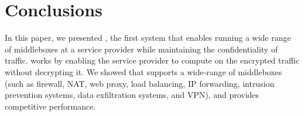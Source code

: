 
\section{Conclusions} \label{sec:concl}



In this paper, we presented \sys, the first system that enables running a wide range of middleboxes at a service provider 
while maintaining the confidentiality of traffic. \sys works by enabling the service provider to compute on the encrypted traffic without decrypting it. 
We showed that \sys supports a wide-range of middleboxes (such as firewall, NAT, web proxy, load balancing, IP forwarding, intrusion prevention systems, data exfiltration systems, and VPN), and provides competitive performance.  